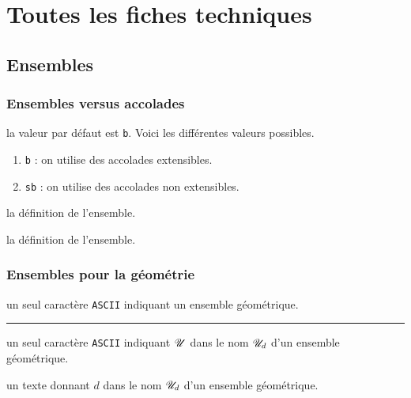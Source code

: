 \documentclass[12pt,a4paper]{article}
\theoremstyle{definition}
\newcommand\separation{
	\medskip
	\hfill\rule{0.5\textwidth}{0.75pt}\hfill
	\medskip
}
\newcommand\ascii{\texttt{ASCII}}
\begin{document}
\newpage
\section{Toutes les fiches techniques} \label{techincal-ids}









\subsection{Ensembles}

\subsubsection{Ensembles versus accolades}




\IDoption{} la valeur par défaut est \verb+b+.  Voici les différentes valeurs possibles.
\begin{enumerate}
	\item \verb+b+ : on utilise des accolades extensibles.

	\item \verb+sb+ : on utilise des accolades non extensibles.
\end{enumerate}

\IDarg{} la définition de l'ensemble.

\IDarg{} la définition de l'ensemble.




\subsubsection{Ensembles pour la géométrie} \label{set-geo}




\IDarg{} un seul caractère \ascii{} indiquant un ensemble géométrique.


\separation



 un seul caractère \ascii{} indiquant $\setgeo{U}$ dans le nom $\setgeo*{U}{d}$ d'un ensemble géométrique.

 un texte donnant $d$ dans le nom $\setgeo*{U}{d}$ d'un ensemble géométrique.
\end{document}
